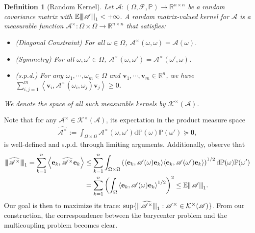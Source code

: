 \documentclass[noinfoline]{imsart}\setcounter{tocdepth}{2}
\renewcommand{\b}[1]{\mathbb{#1}} %
\newcommand{\m}[1]{\mathbf{#1}} %
\newcommand{\s}[1]{\mathscr{#1}} %
\renewcommand{\c}[1]{\mathcal{#1}} %
\newcommand{\innpr}[2]{{\left\langle {#1},{#2}\right\rangle}} %
\newcommand{\rd}{\mathrm{d}} %
\newcommand{\vertiii}[1]{{\left\vert\kern-0.25ex\left\vert\kern-0.25ex\left\vert #1 
    \right\vert\kern-0.25ex\right\vert\kern-0.25ex\right\vert}} %
\newcommand{\vertii}[1]{{\vert\kern-0.25ex\vert\kern-0.25ex\vert #1 
    \vert\kern-0.25ex\vert\kern-0.25ex\vert}} %
\theoremstyle{plain}
\newtheorem{definition}{Definition}[section]
\begin{document}
\begin{definition}[Random Kernel]
Let $\s{A}: (\Omega, \s{F}, \b{P}) \to \b{R}^{n \times n}$ be a random covariance matrix with $\b{E} \vertiii{\s{A}}_{1} < +\infty$. A random matrix-valued kernel \cite{paulsen2016introduction} for $\s{A}$ is a measurable function $\s{A}^{\times}: \Omega \times \Omega \to \b{R}^{n \times n}$ that satisfies:
\begin{itemize}
\item (Diagonal Constraint) For all $\omega \in \Omega$, $\s{A}^{\times}(\omega, \omega) = \s{A}(\omega)$.
\item (Symmetry) For all $\omega, \omega' \in \Omega$, $\s{A}^{\times}(\omega, \omega') = \s{A}^{\times}(\omega', \omega)$.
\item (s.p.d.) For any $\omega_{1}, \cdots, \omega_{m} \in \Omega$ and $\m{v}_{1}, \cdots, \m{v}_{m} \in \b{R}^{n}$, we have $\sum_{i, j = 1}^{m} \innpr{\m{v}_{i}}{\s{A}^{\times}(\omega_{i}, \omega_{j}) \m{v}_{j}} \ge 0$. 
\end{itemize}
We denote the space of all such measurable kernels by $\c{K}^{\times}(\s{A})$.
\end{definition}

Note that for any $\s{A}^{\times} \in \c{K}^{\times}(\s{A})$, its expectation in the product measure space
\begin{align*}
    \widehat{\s{A}^{\times}} := \int_{\Omega \times \Omega} \s{A}^{\times}(\omega, \omega') \rd \b{P}(\omega) \b{P}(\omega') \succeq \m{0},
\end{align*}
is well-defined and s.p.d. through limiting arguments. Additionally, observe that
\begin{align*}
    \vertii{\widehat{\s{A}^{\times}}}_{1} = \sum_{k=1}^{n} \innpr{\m{e}_{k}}{\widehat{\s{A}^{\times}} \m{e}_{k}} &\le \sum_{k=1}^{n} \int_{\Omega \times \Omega} \left( \innpr{\m{e}_{k}}{\s{A}(\omega) \m{e}_{k}} \innpr{\m{e}_{k}}{\s{A}(\omega') \m{e}_{k}} \right)^{1/2} \rd \b{P}(\omega) \b{P}(\omega') \\
    &= \sum_{k=1}^{n} \left( \int_{\Omega} \innpr{\m{e}_{k}}{\s{A}(\omega) \m{e}_{k}}^{1/2} \right)^{2} \le \b{E} \vertii{\s{A}}_{1}.
\end{align*}
Our goal is then to maximize its trace: $\sup \{\vertii{\widehat{\s{A}^{\times}}}_{1} : \s{A}^{\times} \in \c{K}^{\times}(\s{A}) \}$. From our construction, the correspondence between the barycenter problem and the multicoupling problem becomes clear.
\end{document}
